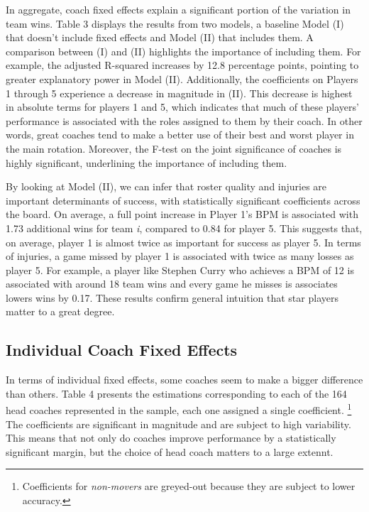 \documentclass[main.tex]{subfiles}
\begin{document}
In aggregate, coach fixed effects explain a significant portion of the variation in team wins. Table 3 displays the results from two models, a baseline Model (I) that doesn't include fixed effects and Model (II) that includes them. A comparison between (I) and (II) highlights the importance of including them. For example, the adjusted R-squared increases by 12.8 percentage points, pointing to greater explanatory power in Model (II). Additionally, the coefficients on Players 1 through 5 experience a decrease in magnitude in (II). This decrease is highest in absolute terms for players 1 and 5, which indicates that much of these players' performance is associated with the roles assigned to them by their coach. In other words, great coaches tend to make a better use of their best and worst player in the main rotation. Moreover, the F-test on the joint significance of coaches is highly significant, underlining the importance of including them. 

%

By looking at Model (II), we can infer that roster quality and injuries are important determinants of success, with statistically significant coefficients across the board. On average, a full point increase in Player 1's BPM is associated with 1.73 additional wins for team \textit{i}, compared to 0.84 for player 5. This suggests that, on average, player 1 is almost twice as important for success as player 5. In terms of injuries, a game missed by player 1 is associated with twice as many losses as player 5. For example, a player like Stephen Curry who achieves a BPM of 12 is associated with around 18 team wins and every game he misses is associates lowers wins by 0.17. These results confirm general intuition that star players matter to a great degree.

\subsection{Individual Coach Fixed Effects}

In terms of individual fixed effects, some coaches seem to make a bigger difference than others. Table 4 presents the estimations corresponding to each of the 164 head coaches represented in the sample, each one assigned a single coefficient. \footnote{Coefficients for \textit{non-movers} are greyed-out because they are subject to lower accuracy.} The coefficients are significant in magnitude and are subject to high variability. This means that not only do coaches improve performance by a statistically significant margin, but the choice of head coach matters to a large extennt. 
\end{document}
